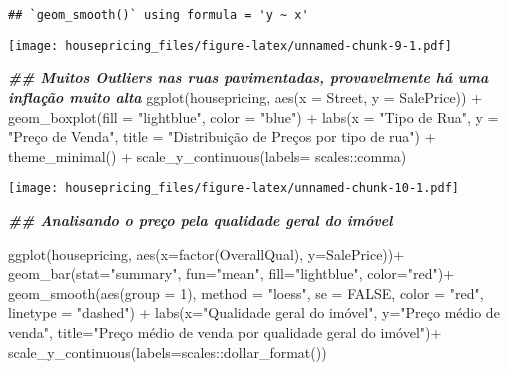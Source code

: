 \documentclass[
]{article}
\newenvironment{Shaded}{\begin{snugshade}}{\end{snugshade}}
\newcommand{\AttributeTok}[1]{\textcolor[rgb]{0.77,0.63,0.00}{#1}}
\newcommand{\ConstantTok}[1]{\textcolor[rgb]{0.00,0.00,0.00}{#1}}
\newcommand{\DecValTok}[1]{\textcolor[rgb]{0.00,0.00,0.81}{#1}}
\newcommand{\DocumentationTok}[1]{\textcolor[rgb]{0.56,0.35,0.01}{\textbf{\textit{#1}}}}
\newcommand{\FunctionTok}[1]{\textcolor[rgb]{0.00,0.00,0.00}{#1}}
\newcommand{\NormalTok}[1]{#1}
\newcommand{\SpecialCharTok}[1]{\textcolor[rgb]{0.00,0.00,0.00}{#1}}
\newcommand{\StringTok}[1]{\textcolor[rgb]{0.31,0.60,0.02}{#1}}
\begin{document}
\begin{verbatim}
## `geom_smooth()` using formula = 'y ~ x'
\end{verbatim}

\texttt{[image: housepricing\_files/figure-latex/unnamed-chunk-9-1.pdf]}

\begin{Shaded}
\begin{Highlighting}[]
\DocumentationTok{\#\# Muitos Outliers nas ruas pavimentadas, provavelmente há uma inflação muito alta}
\FunctionTok{ggplot}\NormalTok{(housepricing, }\FunctionTok{aes}\NormalTok{(}\AttributeTok{x =}\NormalTok{ Street, }\AttributeTok{y =}\NormalTok{ SalePrice)) }\SpecialCharTok{+}
  \FunctionTok{geom\_boxplot}\NormalTok{(}\AttributeTok{fill =} \StringTok{"lightblue"}\NormalTok{, }\AttributeTok{color =} \StringTok{"blue"}\NormalTok{) }\SpecialCharTok{+}
  \FunctionTok{labs}\NormalTok{(}\AttributeTok{x =} \StringTok{"Tipo de Rua"}\NormalTok{, }\AttributeTok{y =} \StringTok{"Preço de Venda"}\NormalTok{, }\AttributeTok{title =} \StringTok{"Distribuição de Preços por tipo de rua"}\NormalTok{) }\SpecialCharTok{+}
  \FunctionTok{theme\_minimal}\NormalTok{() }\SpecialCharTok{+}
  \FunctionTok{scale\_y\_continuous}\NormalTok{(}\AttributeTok{labels=}\NormalTok{ scales}\SpecialCharTok{::}\NormalTok{comma)}
\end{Highlighting}
\end{Shaded}

\texttt{[image: housepricing\_files/figure-latex/unnamed-chunk-10-1.pdf]}

\begin{Shaded}
\begin{Highlighting}[]
\DocumentationTok{\#\# Analisando o preço pela qualidade geral do imóvel}

\FunctionTok{ggplot}\NormalTok{(housepricing, }\FunctionTok{aes}\NormalTok{(}\AttributeTok{x=}\FunctionTok{factor}\NormalTok{(OverallQual), }\AttributeTok{y=}\NormalTok{SalePrice))}\SpecialCharTok{+}
  \FunctionTok{geom\_bar}\NormalTok{(}\AttributeTok{stat=}\StringTok{"summary"}\NormalTok{, }\AttributeTok{fun=}\StringTok{"mean"}\NormalTok{, }\AttributeTok{fill=}\StringTok{"lightblue"}\NormalTok{, }\AttributeTok{color=}\StringTok{"red"}\NormalTok{)}\SpecialCharTok{+}
  \FunctionTok{geom\_smooth}\NormalTok{(}\FunctionTok{aes}\NormalTok{(}\AttributeTok{group =} \DecValTok{1}\NormalTok{), }\AttributeTok{method =} \StringTok{"loess"}\NormalTok{, }\AttributeTok{se =} \ConstantTok{FALSE}\NormalTok{, }\AttributeTok{color =} \StringTok{"red"}\NormalTok{, }\AttributeTok{linetype =} \StringTok{"dashed"}\NormalTok{) }\SpecialCharTok{+}
  \FunctionTok{labs}\NormalTok{(}\AttributeTok{x=}\StringTok{"Qualidade geral do imóvel"}\NormalTok{, }\AttributeTok{y=}\StringTok{"Preço médio de venda"}\NormalTok{, }\AttributeTok{title=}\StringTok{"Preço médio de venda por qualidade geral do imóvel"}\NormalTok{)}\SpecialCharTok{+}
  \FunctionTok{scale\_y\_continuous}\NormalTok{(}\AttributeTok{labels=}\NormalTok{scales}\SpecialCharTok{::}\FunctionTok{dollar\_format}\NormalTok{())}
\end{Highlighting}
\end{Shaded}
\end{document}
